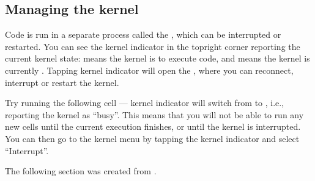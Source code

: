 \documentclass[letterpaper,10pt,english]{sphinxmanual}
\begin{document}
\subsection{Managing the kernel}
\label{\detokenize{notebooks/Intro/NotebookEditor:Managing-the-kernel}}
Code is run in a separate process called the , which can be interrupted or restarted. You can see the kernel indicator in the top\sphinxhyphen{}right corner reporting the current kernel state:  means the kernel is  to execute code, and  means the kernel is currently . Tapping kernel indicator will open the , where you can reconnect, interrupt or restart the kernel.

Try running the following cell — kernel indicator will switch from  to , i.e., reporting the kernel as “busy”. This means that you will not be able to run any new cells until the current execution finishes, or until the kernel is interrupted. You can then go to the kernel menu by tapping the kernel indicator and select “Interrupt”.

The following section was created from .
\end{document}
